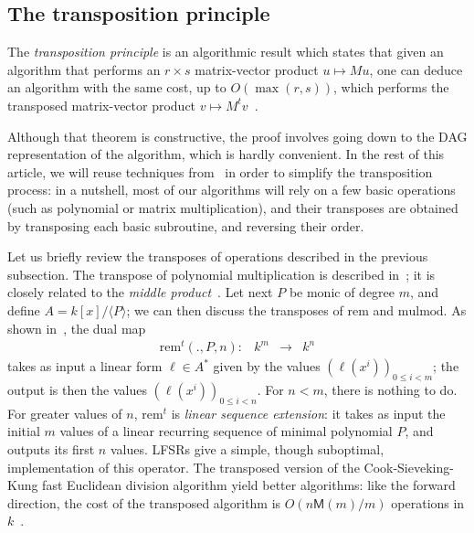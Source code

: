 \documentclass{sig-alternate}
\def\M {\ensuremath{\mathsf{M}}}
\def\rem {\ensuremath{\mathrm{rem}}}
\def\mulmod {\ensuremath{\mathrm{mulmod}}}
\newcounter{algo}
\newcommand{\ang}[1]{\langle#1\rangle}
\begin{document}

\subsection{The transposition principle}
\label{sec:algor-dual-basis}

The {\em transposition principle} is an algorithmic result which
states that given an algorithm that performs an $r \times s$
matrix-vector product $u \mapsto M u$, one can deduce an algorithm
with the same cost, up to $O(\max(r,s))$, which performs the
transposed matrix-vector product $v \mapsto M^t
v$~\cite[Ch.~13]{burgisser+clausen-shokrollahi}.

Although that theorem is constructive, the proof involves going down
to the DAG representation of the algorithm, which is hardly
convenient.  In the rest of this article, we will reuse techniques
from~\cite{bostan+lecerf+schost:tellegen} in order to simplify the
transposition process: in a nutshell, most of our algorithms will rely
on a few basic operations (such as polynomial or matrix
multiplication), and their transposes are obtained by transposing each
basic subroutine, and reversing their order.

Let us briefly review the transposes of operations described in the
previous subsection. The transpose of polynomial multiplication is
described in~\cite{bostan+lecerf+schost:tellegen}; it is closely
related to the {\em middle product}~\cite{hanrot+quercia+zimmermann}.
Let next $P$ be monic of degree $m$, and define $A=k[x]/\ang{P}$; we
can then discuss the transposes of $\rem$ and $\mulmod$. As shown
in~\cite{bostan+lecerf+schost:tellegen}, the dual map
$$
\begin{array}{cccc}
\rem^t(.,P,n): &k^m& \to &k^n
\end{array}$$ 
takes as input a linear form $\ell\in A^\ast$ given by the values
$(\ell(x^i))_{0 \le i < m}$; the output is then the values
$(\ell(x^i))_{0 \le i < n}$. For $n < m$, there is nothing to do. For
greater values of $n$, $\rem^t$ is \emph{linear sequence extension}:
it takes as input the initial $m$ values of a linear recurring
sequence of minimal polynomial $P$, and outputs its first $n$ values.
LFSRs give a simple, though suboptimal, implementation of this
operator. The transposed version of the Cook-Sieveking-Kung fast
Euclidean division algorithm yield better algorithms: like the
forward direction, the cost of the transposed algorithm is
$O(n\M(m)/m)$ operations in $k$~\cite{vzgathen+shoup92:journal,shoup99}.
\end{document}
